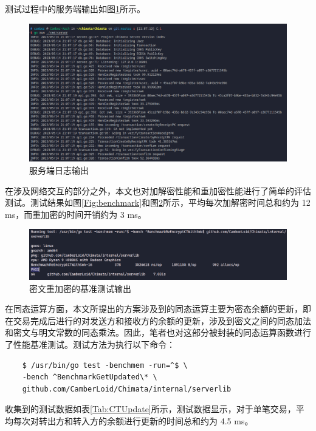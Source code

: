 测试过程中的服务端输出如图\ref{Fig:server}所示。

\begin{figure}[h]
    \centering
    \includegraphics[width=0.9\linewidth]{./Figures/Server_ReceiptPK.png}
    \caption{服务端日志输出}\label{Fig:server}
\end{figure}

在涉及网络交互的部分之外，本文也对加解密性能和重加密性能进行了简单的评估测试。测试结果如图\ref{Fig:benchmark}和图\ref{Fig:bench_reencrypt}所示，平均每次加解密时间总和约为 12 ms，而重加密的时间开销约为 3 ms。

\begin{figure}[h]
    \centering
    \includegraphics[width=0.9\linewidth]{./Figures/Bench_ReEncrypt.png}
    \caption{密文重加密的基准测试输出}\label{Fig:bench_reencrypt}
\end{figure}

在同态运算方面，本文所提出的方案涉及到的同态运算主要为密态余额的更新，即在交易完成后进行的对发送方和接收方的余额的更新，涉及到密文之间的同态加法和密文与明文常数的同态乘法。因此，笔者也对这部分被封装的同态运算函数进行了性能基准测试。测试方法为执行以下命令：

\begin{verbatim}
    $ /usr/bin/go test -benchmem -run=^$ \
    -bench ^BenchmarkGetUpdated\* \
    github.com/CamberLoid/Chimata/internal/serverlib
\end{verbatim}

收集到的测试数据如表\ref{Tab:CTUpdate}所示，测试数据显示，对于单笔交易，平均每次对转出方和转入方的余额进行更新的时间总和约为 4.5 ms。


